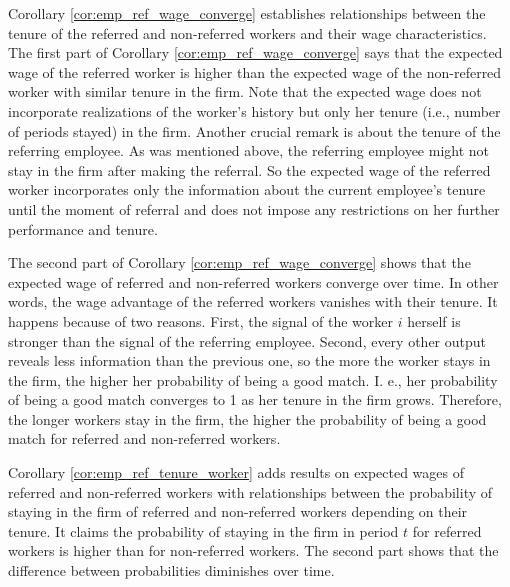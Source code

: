 \documentclass[12pt]{article}
\begin{document}
Corollary \ref{cor:emp_ref_wage_converge} establishes relationships between the tenure of the referred and non-referred workers and their wage characteristics. The first part of Corollary \ref{cor:emp_ref_wage_converge} says that the expected wage of the referred worker is higher than the expected wage of the non-referred worker with similar tenure in the firm. Note that the expected wage does not incorporate realizations of the worker's history but only her tenure (i.e., number of periods stayed) in the firm. Another crucial remark is about the tenure of the referring employee. As was mentioned above, the referring employee might not stay in the firm after making the referral. So the expected wage of the referred worker incorporates only the information about the current employee's tenure until the moment of referral and does not impose any restrictions on her further performance and tenure.

The second part of Corollary \ref{cor:emp_ref_wage_converge} shows that the expected wage of referred and non-referred workers converge over time. In other words, the wage advantage of the referred workers vanishes with their tenure. It happens because of two reasons. First, the signal of the worker $i$ herself is stronger than the signal of the referring employee. Second, every other output reveals less information than the previous one, so the more the worker stays in the firm, the higher her probability of being a good match. I. e., her probability of being a good match converges to 1 as her tenure in the firm grows. Therefore, the longer workers stay in the firm, the higher the probability of being a good match for referred and non-referred workers.

Corollary \ref{cor:emp_ref_tenure_worker} adds results on expected wages of referred and non-referred workers with relationships between the probability of staying in the firm of referred and non-referred workers depending on their tenure. It claims the probability of staying in the firm in period $t$ for referred workers is higher than for non-referred workers. The second part shows that the difference between probabilities diminishes over time.
\end{document}
